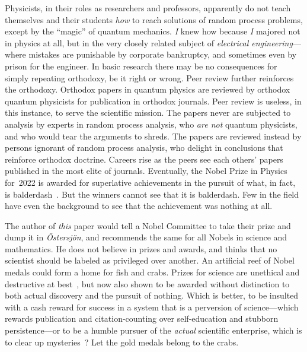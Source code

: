 \documentclass[9pt,technote]{IEEEtran}
\begin{document}
Physicists, in their roles as researchers and professors, apparently
do not teach themselves and their students {\em{how}} to reach
solutions of random process problems, except by the ``magic'' of
quantum mechanics. {\em{I}} knew how because {\em{I}} majored not in
physics at all, but in the very closely related subject of
{\em{electrical engineering}}---where mistakes are punishable by
corporate bankruptcy, and sometimes even by prison for the
engineer. In basic research there may be no consequences for simply
repeating orthodoxy, be it right or wrong. Peer review further
reinforces the orthodoxy. Orthodox papers in quantum physics are
reviewed by orthodox quantum physicists for publication in orthodox
journals. Peer review is useless, in this instance, to serve the
scientific mission. The papers never are subjected to analysis by
experts in random process analysis, who {\em{are not}} quantum
physicists, and who would tear the arguments to shreds. The papers are
reviewed instead by persons ignorant of random process analysis, who
delight in conclusions that reinforce orthodox doctrine. Careers rise
as the peers see each others’ papers published in the most elite of
journals. Eventually, the Nobel Prize in Physics for~2022 is awarded
for superlative achievements in the pursuit of what, in fact, is
balderdash~\cite{enwiki:1169021780}. But the winners cannot see that
it is balderdash. Few in the field have even the background to see
that the achievement was nothing at all.

The author of {\em{this}} paper would tell a Nobel Committee to take
their prize and dump it in {\em{Östersjön}}, and recommends the same
for all Nobels in science and mathematics. He does not believe in
prizes and awards, and thinks that no scientist should be labeled as
privileged over another. An artificial reef of Nobel medals could form
a home for fish and crabs. Prizes for science are unethical and
destructive at best~\cite{kohn1993punished,sciencemag:nobelbad}, but
now also shown to be awarded without distinction to both actual
discovery and the pursuit of nothing. Which is better, to be insulted
with a cash reward for success in a system that is a perversion of
science---which rewards publication and citation-counting over
self-education and stubborn persistence---or to be a humble pursuer of
the {\em{actual}} scientific enterprise, which is to clear up
mysteries~\cite{clearingupmysteries}? Let the gold medals belong to
the crabs.

{}

\end{document}
